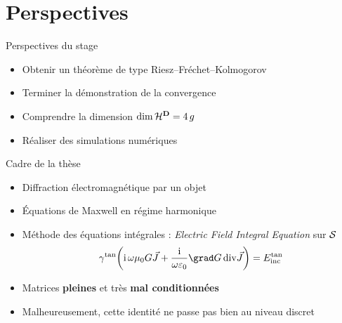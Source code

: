 \section{Perspectives}

\begin{frame}
\begin{block}{Perspectives du stage}
\begin{itemize}
    \item Obtenir un théorème de type Riesz–Fréchet–Kolmogorov
    \item Terminer la démonstration de la convergence
    \item Comprendre la dimension $\dim \mathcal{H}^{\mathbf{D}} = 4 \, g$
    \item Réaliser des simulations numériques
\end{itemize}
\end{block}
\begin{block}{Cadre de la thèse}
\begin{itemize}
    \item Diffraction électromagnétique par un objet
    \item Équations de Maxwell en régime harmonique
    \item Méthode des équations intégrales : \emph{Electric Field Integral Equation} sur {\color{mydarkgreen}$\mathcal{S}$}
    \[
    \gamma^\mathrm{tan} \mathopen{}\left( \mathrm{i} \, \omega \mu_0 G \vec{J} + \frac{\mathrm{i}}{\omega \varepsilon_0} \grad G \, \mathrm{div} \vec{J} \right) = E^\mathrm{tan}_\mathrm{inc}
    \]
    \item Matrices \textbf{pleines} et très \textbf{mal conditionnées} %
\end{itemize}
\begin{center}
\end{center}
\begin{itemize}
    \item Malheureusement, cette identité ne passe pas bien au niveau discret
\end{itemize}
\end{block}

\end{frame}